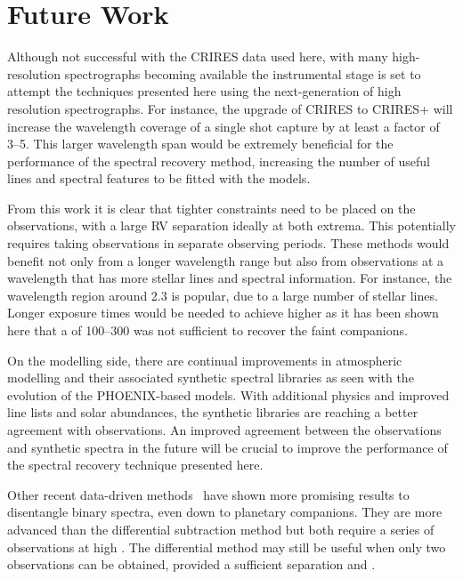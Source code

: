 \section{Future Work}
\label{subsec:future}

Although not successful with the CRIRES data used here, with many high-resolution \nir{} spectrographs becoming available the instrumental stage is set to attempt the techniques presented here using the next-generation of high resolution spectrographs.
For instance, the upgrade of CRIRES to CRIRES+ will increase the wavelength coverage of a single shot capture by at least a factor of 3--5.
This larger wavelength span would be extremely beneficial for the \textchisquared{} performance of the spectral recovery method, increasing the number of useful lines and spectral features to be fitted with the models.

From this work it is clear that tighter constraints need to be placed on the observations, with a large {RV} separation ideally at both extrema.
This potentially requires taking observations in separate observing periods.
These methods would benefit not only from a longer wavelength range but also from observations at a wavelength that has more stellar lines and spectral information.
For instance, the wavelength region around 2.3\um{} is popular, due to a large number of stellar  lines.
Longer exposure times would be needed to achieve higher \snr{} as it has been shown here that a \snr{} of 100--300 was not sufficient to recover the faint companions.

On the modelling side, there are continual improvements in atmospheric modelling and their associated synthetic spectral libraries as seen with the evolution of the PHOENIX-based models.
With additional physics and improved line lists and solar abundances, the synthetic libraries are reaching a better agreement with \nir{} observations.
An improved agreement between the \nir{} observations and synthetic spectra in the future will be crucial to improve the performance of the spectral recovery technique presented here.

Other recent data-driven methods~\citep[e.g.][]{piskorz_evidence_2016, czekala_disentangling_2017} have shown more promising results to disentangle binary spectra, even down to planetary companions.
They are more advanced than the differential subtraction method but both require a series of observations at high \snr{}.
The differential method may still be useful when only two observations can be obtained, provided a sufficient separation and \snr{}.

